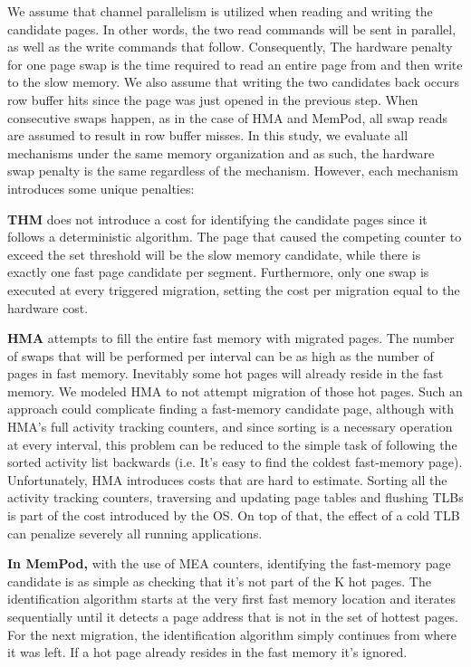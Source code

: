 We assume that channel parallelism is utilized when reading and writing the candidate pages. In other words, the two read commands will be sent in parallel, as well as the write commands that follow. Consequently, The hardware penalty for one page swap is the time required to read an entire page from and then write to the slow memory. We also assume that writing the two candidates back occurs row buffer hits since the page was just opened in the previous step. When consecutive swaps happen, as in the case of HMA and MemPod, all swap reads are assumed to result in row buffer misses. In this study, we evaluate all mechanisms under the same memory organization and as such, the hardware swap penalty is the same regardless of the mechanism. However, each mechanism introduces some unique penalties:

	\textbf{THM} does not introduce a cost for identifying the candidate pages since it follows a deterministic algorithm. The page that caused the competing counter to exceed the set threshold will be the slow memory candidate, while there is exactly one fast page candidate per segment. Furthermore, only one swap is executed at every triggered migration, setting the cost per migration equal to the hardware cost.
	
    \textbf{HMA } attempts to fill the entire fast memory with migrated pages. The number of swaps that will be performed per interval can be as high as the number of pages in fast memory. Inevitably some hot pages will already reside in the fast memory. We modeled HMA to not attempt migration of those hot pages. Such an approach could complicate finding a fast-memory candidate page, although with HMA's full activity tracking counters, and since sorting is a necessary operation at every interval, this problem can be reduced to the simple task of following the sorted activity list backwards (i.e. It's easy to find the coldest fast-memory page). Unfortunately, HMA introduces costs that are hard to estimate. Sorting all the activity tracking counters, traversing and updating page tables and flushing TLBs is part of the cost introduced by the OS. On top of that, the effect of a cold TLB can penalize severely all running applications.
	
    \textbf{In MemPod,} with the use of MEA counters, identifying the fast-memory page candidate is as simple as checking that it's not part of the K hot pages. The identification algorithm starts at the very first fast memory location and iterates sequentially until it detects a page address that is not in the set of hottest pages. For the next migration, the identification algorithm simply continues from where it was left. If a hot page already resides in the fast memory it's ignored.

